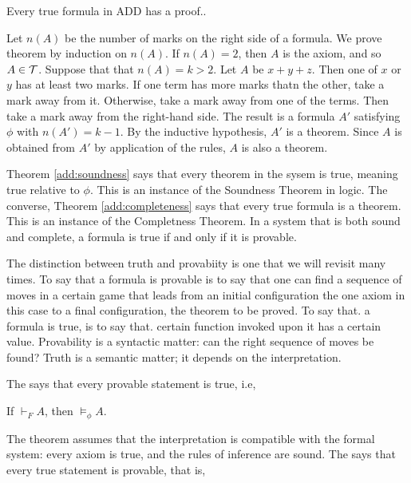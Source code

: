 \begin{theorem}
\label{add:completeness}
Every true formula in ADD has a proof..
\end{theorem}

 Let $n(A)$ be the number of marks on the right side of a formula. We prove theorem by induction on $n(A)$.  If $n(A) = 2$, then $A$ is the axiom, and so $A \in \mathcal{T}$.  Suppose that that $n(A) = k > 2$.  Let $A$ be $x + y + z$.  Then one of $x$ or $y$ has at least two marks.  If one term has more marks thatn the other, take a mark away from it.  Otherwise, take a mark away from one of the terms.  Then take a mark away from the right-hand side.  The result is a formula $A'$ satisfying $\phi$ with $n(A') = k - 1$. By the inductive hypothesis, $A'$ is a theorem.  Since $A$ is obtained from $A'$ by application of the rules, $A$ is also a theorem. 


Theorem \ref{add:soundness} says that every theorem in the sysem  is true, meaning true relative to $\phi$.  This is an instance of the Soundness Theorem in logic.
The converse, Theorem \ref{add:completeness} says that every true formula is a theorem.  This is an instance of the Completness Theorem.    In a system that is both sound and complete, a formula is true if and only if it is provable.

The distinction between truth and provabiity is one that we will revisit many times.  To say that a formula is provable is to say that one can find a sequence of moves in a certain game that leads from an initial configuration \mdash  the one axiom in this case \mdash to a final configuration, the theorem to be proved.  To say that. a formula is true, is to say that. certain function invoked upon it has a  certain value.  Provability is a syntactic matter: can the right sequence of moves be found?  Truth is a semantic matter; it depends on the interpretation.




The  says that every provable statement is true, i.e,

\begin{indent}
If $\vdash_F A$, then $\models_\phi A$.
\end{indent}

The theorem assumes that the interpretation is compatible with the formal system: every axiom is true, and the rules of inference are sound. The  says that every true statement is provable, that is,

